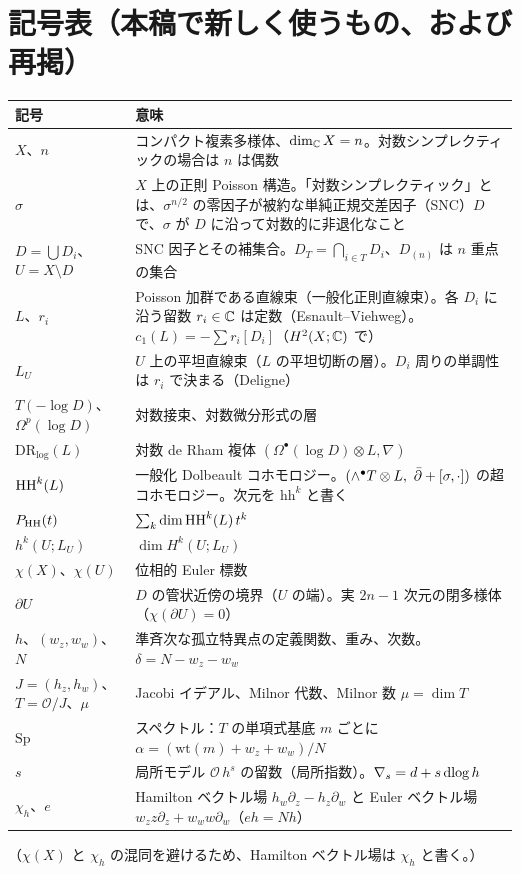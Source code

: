\section{記号表（本稿で新しく使うもの、および再掲）}\label{sec:notation}
\begin{longtable}{>{\raggedright\arraybackslash}p{3.8cm}>{\raggedright\arraybackslash}p{11.2cm}}
\toprule 記号 & 意味\\ \midrule\endhead
$X$、$n$ & コンパクト複素多様体、$\dim_\mathbb C X=n$。対数シンプレクティックの場合は $n$ は偶数\\
$\sigma$ & $X$ 上の正則 Poisson 構造。「対数シンプレクティック」とは、$\sigma^{n/2}$ の零因子が被約な単純正規交差因子（SNC）$D$ で、$\sigma$ が $D$ に沿って対数的に非退化なこと\\
$D=\bigcup D_i$、$U=X\setminus D$ & SNC 因子とその補集合。$D_T=\bigcap_{i\in T}D_i$、$D_{(n)}$ は $n$ 重点の集合\\
$L$、$r_i$ & Poisson 加群である直線束（一般化正則直線束）。各 $D_i$ に沿う留数 $r_i\in\mathbb C$ は定数（Esnault--Viehweg）。$c_1(L)=-\sum r_i[D_i]$（$H^2(X;\mathbb C)$ で）\\
$L_U$ & $U$ 上の平坦直線束（$L$ の平坦切断の層）。$D_i$ 周りの単調性は $r_i$ で決まる（Deligne）\\
$T(-\log D)$、$\Omega^p(\log D)$ & 対数接束、対数微分形式の層\\
$\mathrm{DR}_{\log}(L)$ & 対数 de Rham 複体 $(\Omega^\bullet(\log D)\otimes L,\nabla)$\\
$\mathrm{HH}^k(L)$ & 一般化 Dolbeault コホモロジー。$(\wedge^\bullet T\otimes L,\ \dbar+[\sigma,\cdot])$ の超コホモロジー。次元を $\mathrm{hh}^k$ と書く\\
$P_{\mathrm{HH}}(t)$ & $\sum_k\dim\mathrm{HH}^k(L)\,t^k$\\
$h^k(U;L_U)$ & $\dim H^k(U;L_U)$\\
$\chi(X)$、$\chi(U)$ & 位相的 Euler 標数\\
$\partial U$ & $D$ の管状近傍の境界（$U$ の端）。実 $2n-1$ 次元の閉多様体（$\chi(\partial U)=0$）\\
$h$、$(w_z,w_w)$、$N$ & 準斉次な孤立特異点の定義関数、重み、次数。$\delta=N-w_z-w_w$\\
$J=(h_z,h_w)$、$T=\mathcal O/J$、$\mu$ & Jacobi イデアル、Milnor 代数、Milnor 数 $\mu=\dim T$\\
$\mathrm{Sp}$ & スペクトル：$T$ の単項式基底 $m$ ごとに $\alpha=(\mathrm{wt}(m)+w_z+w_w)/N$\\
$s$ & 局所モデル $\mathcal O\,h^s$ の留数（局所指数）。$\nabla_s=d+s\,\mathrm{dlog}\, h$\\
$\chi_h$、$e$ & Hamilton ベクトル場 $h_w\partial_z-h_z\partial_w$ と Euler ベクトル場 $w_zz\partial_z+w_ww\partial_w$（$e h=Nh$）\\
\bottomrule
\end{longtable}
（$\chi(X)$ と $\chi_h$ の混同を避けるため、Hamilton ベクトル場は $\chi_h$ と書く。）

